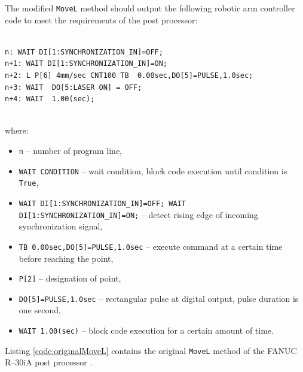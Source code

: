 The modified \texttt{MoveL} method should output the following robotic arm controller code to meet the requirements of the post processor:


\begin{verbatim}

n: WAIT DI[1:SYNCHRONIZATION_IN]=OFF;
n+1: WAIT DI[1:SYNCHRONIZATION_IN]=ON;
n+2: L P[6] 4mm/sec CNT100 TB  0.00sec,DO[5]=PULSE,1.0sec;
n+3: WAIT  DO[5:LASER ON] = OFF;
n+4: WAIT  1.00(sec);
  
\end{verbatim}


where:

\begin{itemize}

    \item \texttt{n} -- number of program line, 
    \item \texttt{WAIT CONDITION} -- wait condition, block code execution until condition  is \texttt{True},
    \item \texttt{WAIT DI[1:SYNCHRONIZATION_IN]=OFF; WAIT DI[1:SYNCHRONIZATION_IN]=ON;} -- detect rising edge of incoming synchronization signal,
    \item \texttt{TB  0.00sec,DO[5]=PULSE,1.0sec} -- execute command at a certain time before reaching the point,
    \item \texttt{P[2]} -- designation of point,
    \item \texttt{DO[5]=PULSE,1.0sec} -- rectangular pulse at digital output, pulse duration is one second, 
    \item \texttt{WAIT  1.00(sec)} -- block code execution for a certain amount of time.

\end{itemize}

 Listing \ref{code:originalMoveL} contains the original \texttt{MoveL} method of the FANUC R--30iA post processor \cite{postmethods}. 


